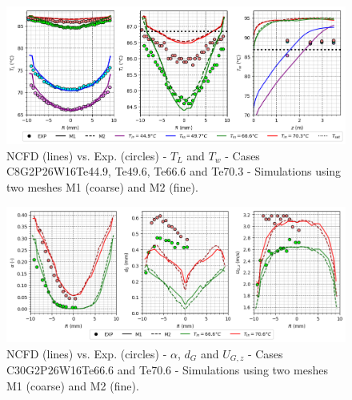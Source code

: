 %
\begin{figure}[h!]
\centering
\includegraphics[scale=0.60]{img/DEBORA/c8.png}
\caption{NCFD (lines) vs. Exp. (circles) - $T_{L}$ and $T_{w}$ - Cases C8G2P26W16Te44.9, Te49.6, Te66.6 and Te70.3 - Simulations using two meshes M1 (coarse) and M2 (fine).}
\label{fig:th_1phi_res}
\end{figure}
%




%
\begin{figure}[h!]
\centering
\includegraphics[scale=0.60]{img/DEBORA/c30.png}
\caption{NCFD (lines) vs. Exp. (circles) - $\alpha$, $d_{G}$ and $U_{G,z}$ - Cases C30G2P26W16Te66.6 and Te70.6 - Simulations using two meshes M1 (coarse) and M2 (fine).}
\label{fig:topology_res}
\end{figure}
%

